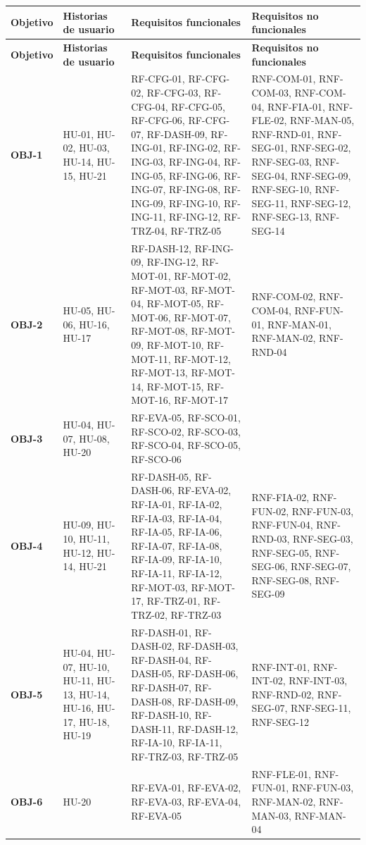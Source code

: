 \documentclass[11pt,a4paper]{report}
\begin{document}
\begin{xltabular}{\linewidth}{@{}p{1.4cm}p{3.2cm}XX@{}}
\toprule
\textbf{Objetivo} & \textbf{Historias de usuario} & \textbf{Requisitos funcionales} & \textbf{Requisitos no funcionales} \\
\midrule
\endfirsthead
\toprule
\textbf{Objetivo} & \textbf{Historias de usuario} & \textbf{Requisitos funcionales} & \textbf{Requisitos no funcionales} \\
\midrule
\endhead
\bottomrule
\endlastfoot

\textbf{OBJ-1} & HU-01, HU-02, HU-03, HU-14, HU-15, HU-21 & {\footnotesize RF-CFG-01, RF-CFG-02, RF-CFG-03, RF-CFG-04, RF-CFG-05, RF-CFG-06, RF-CFG-07, RF-DASH-09, RF-ING-01, RF-ING-02, RF-ING-03, RF-ING-04, RF-ING-05, RF-ING-06, RF-ING-07, RF-ING-08, RF-ING-09, RF-ING-10, RF-ING-11, RF-ING-12, RF-TRZ-04, RF-TRZ-05} & {\footnotesize RNF-COM-01, RNF-COM-03, RNF-COM-04, RNF-FIA-01, RNF-FLE-02, RNF-MAN-05, RNF-RND-01, RNF-SEG-01, RNF-SEG-02, RNF-SEG-03, RNF-SEG-04, RNF-SEG-09, RNF-SEG-10, RNF-SEG-11, RNF-SEG-12, RNF-SEG-13, RNF-SEG-14} \\
\textbf{OBJ-2} & HU-05, HU-06, HU-16, HU-17 & {\footnotesize RF-DASH-12, RF-ING-09, RF-ING-12, RF-MOT-01, RF-MOT-02, RF-MOT-03, RF-MOT-04, RF-MOT-05, RF-MOT-06, RF-MOT-07, RF-MOT-08, RF-MOT-09, RF-MOT-10, RF-MOT-11, RF-MOT-12, RF-MOT-13, RF-MOT-14, RF-MOT-15, RF-MOT-16, RF-MOT-17} & {\footnotesize RNF-COM-02, RNF-COM-04, RNF-FUN-01, RNF-MAN-01, RNF-MAN-02, RNF-RND-04} \\
\textbf{OBJ-3} & HU-04, HU-07, HU-08, HU-20 & {\footnotesize RF-EVA-05, RF-SCO-01, RF-SCO-02, RF-SCO-03, RF-SCO-04, RF-SCO-05, RF-SCO-06} & {\footnotesize } \\
\textbf{OBJ-4} & HU-09, HU-10, HU-11, HU-12, HU-14, HU-21 & {\footnotesize RF-DASH-05, RF-DASH-06, RF-EVA-02, RF-IA-01, RF-IA-02, RF-IA-03, RF-IA-04, RF-IA-05, RF-IA-06, RF-IA-07, RF-IA-08, RF-IA-09, RF-IA-10, RF-IA-11, RF-IA-12, RF-MOT-03, RF-MOT-17, RF-TRZ-01, RF-TRZ-02, RF-TRZ-03} & {\footnotesize RNF-FIA-02, RNF-FUN-02, RNF-FUN-03, RNF-FUN-04, RNF-RND-03, RNF-SEG-03, RNF-SEG-05, RNF-SEG-06, RNF-SEG-07, RNF-SEG-08, RNF-SEG-09} \\
\textbf{OBJ-5} & HU-04, HU-07, HU-10, HU-11, HU-13, HU-14, HU-16, HU-17, HU-18, HU-19 & {\footnotesize RF-DASH-01, RF-DASH-02, RF-DASH-03, RF-DASH-04, RF-DASH-05, RF-DASH-06, RF-DASH-07, RF-DASH-08, RF-DASH-09, RF-DASH-10, RF-DASH-11, RF-DASH-12, RF-IA-10, RF-IA-11, RF-TRZ-03, RF-TRZ-05} & {\footnotesize RNF-INT-01, RNF-INT-02, RNF-INT-03, RNF-RND-02, RNF-SEG-07, RNF-SEG-11, RNF-SEG-12} \\
\textbf{OBJ-6} & HU-20 & {\footnotesize RF-EVA-01, RF-EVA-02, RF-EVA-03, RF-EVA-04, RF-EVA-05} & {\footnotesize RNF-FLE-01, RNF-FUN-01, RNF-FUN-03, RNF-MAN-02, RNF-MAN-03, RNF-MAN-04} \\

\end{xltabular}
\end{document}
